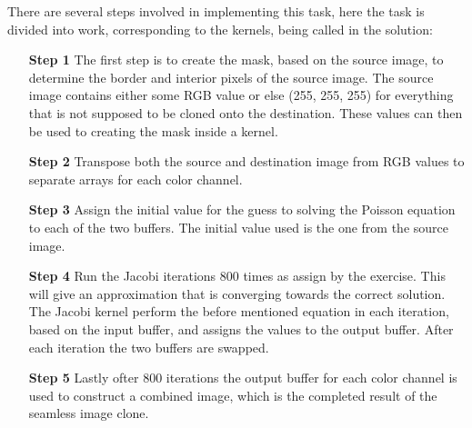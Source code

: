 There are several steps involved in implementing this task, here the task is divided into work, corresponding to the kernels, being called in the solution:
\begin{enumerate}
	\item[\textbf{Step 1}]
The first step is to create the mask, based on the source image, to determine the border and interior pixels of the source image. The source image contains either some RGB value or else (255, 255, 255) for everything that is not supposed to be cloned onto the destination. These values can then be used to creating the mask inside a kernel.
	\item[\textbf{Step 2}]
Transpose both the source and destination image from RGB values to separate arrays for each color channel.
	\item[\textbf{Step 3}]
Assign the initial value for the guess to solving the Poisson equation to each of the two buffers. The initial value used is the one from the source image.
	\item[\textbf{Step 4}]
Run the Jacobi iterations 800 times as assign by the exercise. This will give an approximation that is converging towards the correct solution. The Jacobi kernel perform the before mentioned equation in each iteration, based on the input buffer, and assigns the values to the output buffer. After each iteration the two buffers are swapped.
	\item[\textbf{Step 5}]
Lastly ofter 800 iterations the output buffer for each color channel is used to construct a combined image, which is the completed result of the seamless image clone.


\end{enumerate}